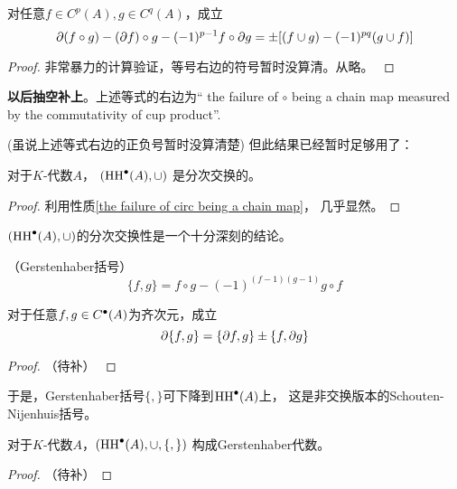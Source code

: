 
\begin{prop}
\label{the failure of circ being a chain map}
对任意$f\in C^p(A),g\in C^q(A)$，成立
$$\partial(f\circ g)-(\partial f)\circ g-(-1)^{p-1}f\circ\partial g
=\pm[(f\cup g)-(-1)^{pq}(g\cup f)]$$
\end{prop}

\begin{proof}
{
非常暴力的计算验证，等号右边的符号暂时没算清。从略。
}
\end{proof}

\textbf{以后抽空补上}。上述等式的右边为“
the failure of $\circ$ being a chain map
measured by the commutativity of cup product”.

(虽说上述等式右边的正负号暂时没算清楚)
但此结果已经暂时足够用了：

\begin{cor}对于$K$-代数$A$，
$(\operatorname{HH}^{\bullet}(A),\cup)$%
是分次交换的。
\end{cor}

\begin{proof}
利用性质\ref{the failure of circ being a chain map}，
几乎显然。
\end{proof}

$(\operatorname{HH}^{\bullet}(A),\cup)$的分次交换性是一个十分深刻的结论。


\begin{definition}（Gerstenhaber括号）
$$\{f,g\}=f\circ g-(-1)^{(f-1)(g-1)}g\circ f$$
\end{definition}


\begin{prop}对于任意$f,g\in C^{\bullet}(A)$为齐次元，成立
$$\partial\{f,g\}=\{\partial f,g\}\pm\{f,\partial g\}$$
\end{prop}
\begin{proof}
{\color{red}
（待补）
}
\end{proof}

于是，Gerstenhaber括号$\{,\}$可下降到$\operatorname{HH}^{\bullet}(A)$上，
这是非交换版本的Schouten-Nijenhuis括号。

\begin{prop}
对于$K$-代数$A$，$(\operatorname{HH}^{\bullet}(A),\cup,\{,\})$
构成Gerstenhaber代数。
\end{prop}
\begin{proof}
{\color{red}
（待补）}
\end{proof}

